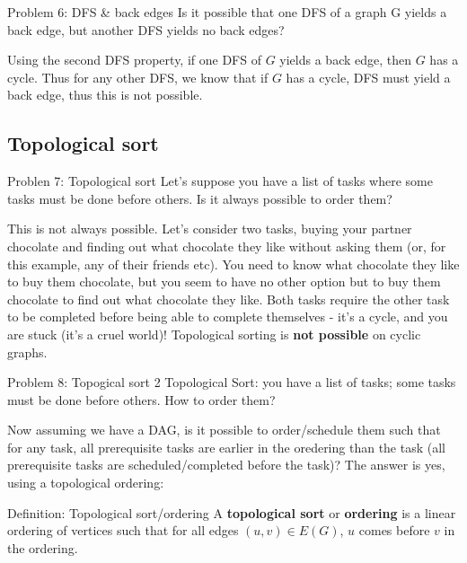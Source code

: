 \documentclass{article}
\begin{document}
\begin{problem}{Problem 6: DFS \& back edges}
    Is it possible that one DFS of a graph G yields a back edge, but another DFS yields no back edges?
\end{problem}

Using the second DFS property, if one DFS of $G$ yields a back edge, then $G$ has a cycle. Thus for any other DFS, we know that if $G$ has a cycle, DFS must yield a back edge, thus this is not possible.

\subsection{Topological sort}

\begin{problem}{Problen 7: Topological sort}
    Let's suppose you have a list of tasks where some tasks must be done before others. Is it always possible to order them?
\end{problem}

This is not always possible. Let's consider two tasks, buying your partner chocolate and finding out what chocolate they like without asking them (or, for this example, any of their friends etc). You need to know what chocolate they like to buy them chocolate, but you seem to have no other option but to buy them chocolate to find out what chocolate they like. Both tasks require the other task to be completed before being able to complete themselves - it's a cycle, and you are stuck (it's a cruel world)! Topological sorting is \textbf{not possible} on cyclic graphs.


\begin{problem}{Problem 8: Topogical sort 2}
    Topological Sort: you have a list of tasks; some tasks must be done before others. How to order them?
\end{problem}

Now assuming we have a DAG, is it possible to order/schedule them such that for any task, all prerequisite tasks are earlier in the oredering than the task (all prerequisite tasks are scheduled/completed before the task)? The answer is yes, using a topological ordering: 

\begin{definition}{Definition: Topological sort/ordering}
    A \textbf{topological sort} or \textbf{ordering} is a linear ordering of vertices such that for all edges $(u, v) \in E(G)$, $u$ comes before $v$ in the ordering.
\end{definition}
\end{document}
